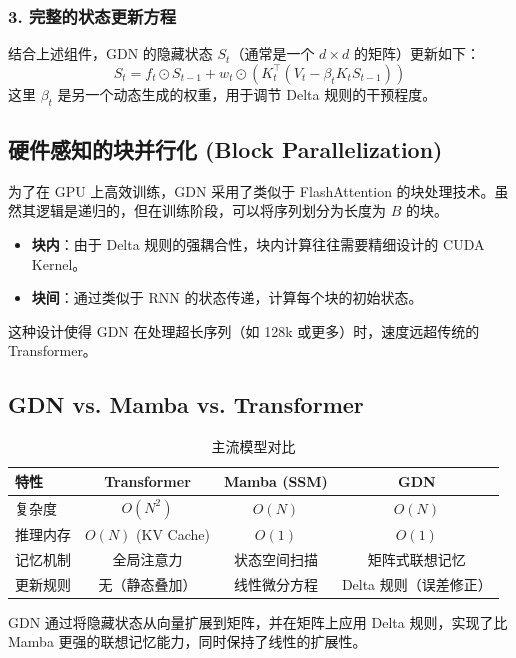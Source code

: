 \subsubsection{3. 完整的状态更新方程}
结合上述组件，GDN 的隐藏状态 $S_t$（通常是一个 $d \times d$ 的矩阵）更新如下：
\begin{equation}
    S_t = f_t \odot S_{t-1} + w_t \odot (K_t^\top (V_t - \beta_t K_t S_{t-1}))
\end{equation}
这里 $\beta_t$ 是另一个动态生成的权重，用于调节 Delta 规则的干预程度。

\subsection{硬件感知的块并行化 (Block Parallelization)}
为了在 GPU 上高效训练，GDN 采用了类似于 FlashAttention 的块处理技术。虽然其逻辑是递归的，但在训练阶段，可以将序列划分为长度为 $B$ 的块。
\begin{itemize}
    \item \textbf{块内}：由于 Delta 规则的强耦合性，块内计算往往需要精细设计的 CUDA Kernel。
    \item \textbf{块间}：通过类似于 RNN 的状态传递，计算每个块的初始状态。
\end{itemize}
这种设计使得 GDN 在处理超长序列（如 128k 或更多）时，速度远超传统的 Transformer。

\subsection{GDN vs. Mamba vs. Transformer}
\begin{table}[H]
    \centering
    \begin{tabular}{|l|c|c|c|}
        \hline
        特性 & Transformer & Mamba (SSM) & GDN \\
        \hline
        复杂度 & $O(N^2)$ & $O(N)$ & $O(N)$ \\
        推理内存 & $O(N)$ (KV Cache) & $O(1)$ & $O(1)$ \\
        记忆机制 & 全局注意力 & 状态空间扫描 & 矩阵式联想记忆 \\
        更新规则 & 无（静态叠加） & 线性微分方程 & Delta 规则（误差修正） \\
        \hline
    \end{tabular}
    \caption{主流模型对比}
\end{table}
GDN 通过将隐藏状态从向量扩展到矩阵，并在矩阵上应用 Delta 规则，实现了比 Mamba 更强的联想记忆能力，同时保持了线性的扩展性。
